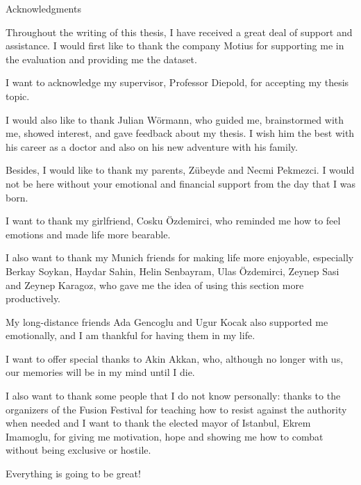 \thispagestyle{empty}

\vspace*{20mm}

\begin{center}
{ Acknowledgments}
\end{center}

\vspace{10mm}

Throughout the writing of this thesis, I have received a great deal of support and assistance. I would first like to thank the company Motius for supporting me in the evaluation and providing me the dataset.

I want to acknowledge my supervisor, Professor Diepold, for accepting my thesis topic.

I would also like to thank Julian Wörmann, who guided me, brainstormed with me, showed interest, and gave feedback about my thesis. I wish him the best with his career as a doctor and also on his new adventure with his family.

Besides, I would like to thank my parents, Zübeyde and Necmi Pekmezci. I would not be here without your emotional and financial support from the day that I was born.

I want to thank my girlfriend, Cosku Özdemirci, who reminded me how to feel emotions and made life more bearable.

I also want to thank my Munich friends for making life more enjoyable, especially Berkay Soykan, Haydar Sahin, Helin Senbayram, Ulas Özdemirci, Zeynep Sasi and Zeynep Karagoz, who gave me the idea of using this section more productively.

My long-distance friends Ada Gencoglu and Ugur Kocak also supported me emotionally, and I am thankful for having them in my life.

I want to offer special thanks to Akin Akkan, who, although no longer with us, our memories will be in my mind until I die.

I also want to thank some people that I do not know personally: thanks to the organizers of the Fusion Festival for teaching how to resist against the authority when needed and I want to thank the elected mayor of Istanbul, Ekrem Imamoglu, for giving me motivation, hope and showing me how to combat without being exclusive or hostile.

Everything is going to be great!


\cleardoublepage{}
